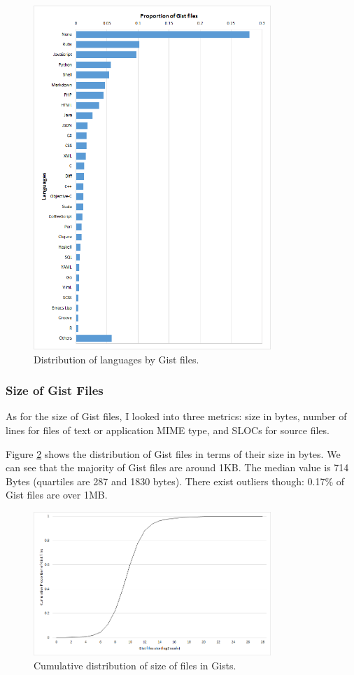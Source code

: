 \begin{figure}[!htbp]
	\centering
	\includegraphics[width=0.8\textwidth]{figures/languageDistribution.png}
	\caption{Distribution of languages by Gist files.}
	\label{fig:languageDist}
\end{figure}

\subsubsection{Size of Gist Files}
As for the size of Gist files, I looked into three metrics: size in bytes, number of lines for files of text or application MIME type, and SLOCs for source files. 

Figure \ref{fig:size} shows the distribution of Gist files in terms of their size in bytes. We can see that the majority of Gist files are around 1KB. The median value is 714 Bytes (quartiles are 287 and 1830 bytes). There exist outliers though: 0.17\% of Gist files are over 1MB.

\begin{figure}[!htb]
	\centering
	\includegraphics[width=0.8\textwidth]{figures/gist_file_size_log.png}
	\caption{Cumulative distribution of size of files in Gists.}
	\label{fig:size}
\end{figure}

